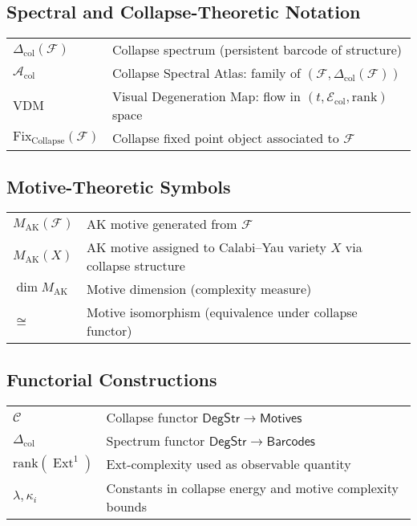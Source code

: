 \documentclass[11pt]{article}
\DeclareMathOperator{\Ext}{Ext}
\begin{document}
\subsection*{Spectral and Collapse-Theoretic Notation}

\begin{tabular}{ll}
$\Delta_{\mathrm{col}}(\mathcal{F})$ & Collapse spectrum (persistent barcode of structure) \\
$\mathcal{A}_{\mathrm{col}}$ & Collapse Spectral Atlas: family of $(\mathcal{F}, \Delta_{\mathrm{col}}(\mathcal{F}))$ \\
$\mathrm{VDM}$ & Visual Degeneration Map: flow in $(t, \mathcal{E}_{\mathrm{col}}, \mathrm{rank})$ space \\
$\mathrm{Fix}_{\mathrm{Collapse}}(\mathcal{F})$ & Collapse fixed point object associated to $\mathcal{F}$ \\
\end{tabular}

\vspace{1em}

\subsection*{Motive-Theoretic Symbols}

\begin{tabular}{ll}
$M_{\mathrm{AK}}(\mathcal{F})$ & AK motive generated from $\mathcal{F}$ \\
$M_{\mathrm{AK}}(X)$ & AK motive assigned to Calabi–Yau variety $X$ via collapse structure \\
$\dim M_{\mathrm{AK}}$ & Motive dimension (complexity measure) \\
$\cong$ & Motive isomorphism (equivalence under collapse functor) \\
\end{tabular}

\vspace{1em}

\subsection*{Functorial Constructions}

\begin{tabular}{ll}
$\mathcal{C}$ & Collapse functor $\mathsf{DegStr} \to \mathsf{Motives}$ \\
$\Delta_{\mathrm{col}}$ & Spectrum functor $\mathsf{DegStr} \to \mathsf{Barcodes}$ \\
$\mathrm{rank}(\Ext^1)$ & Ext-complexity used as observable quantity \\
$\lambda, \kappa_i$ & Constants in collapse energy and motive complexity bounds \\
\end{tabular}
\end{document}
